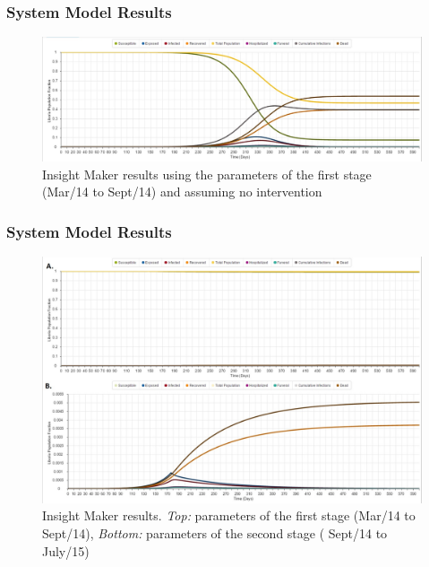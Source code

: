 \documentclass[30pt]{beamer}
\begin{document}
\begin{frame}
\frametitle{System Model Results}
\begin{figure}[!h]
  \centering
  \includegraphics[width=1\textwidth]{LB_NoInt_SD_IM}
  \caption{ Insight Maker results using the parameters of the first stage (Mar/14 to Sept/14) and assuming no intervention}
\label{fig:LB_IM_NoIn} 
\end{figure}
\end{frame}

\begin{frame}
\frametitle{System Model Results}
\begin{figure}[!h]
  \centering
  \includegraphics[width=1\textwidth]{LB_Int3_SD_IM}
  \caption{ Insight Maker results. \textit{Top:} parameters of the first stage (Mar/14 to Sept/14), \textit{Bottom:} parameters of the second stage ( Sept/14 to July/15)}
\label{fig:LB_IM_In} 
\end{figure}
\end{frame}
\end{document}
